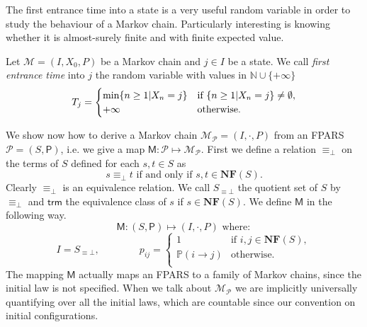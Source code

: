 \begin{LONG}
	The first entrance time into a state is a very useful random variable in order to study the behaviour of a Markov chain. Particularly interesting is knowing whether it is almost-surely finite and with finite expected value.
	\begin{definition}
		Let $\mathcal{M}=(I,X_0,P)$ be a Markov chain and $j\in I$ be a state. We call \emph{first entrance time} into $j$ the random variable with values in $\mathbb{N}\cup \{+\infty\}$
		$$
		T_j= \begin{cases}
		\min\{n\geq 1|X_n=j\} & \textnormal{if }\{n\geq 1|X_n=j\}\neq \emptyset,\\
		+\infty & \textnormal{otherwise}.
		\end{cases}
		$$
	\end{definition}
	We show now how to derive a Markov chain $\mathcal{M_P}=(I,\cdot,P)$ from an FPARS $\mathcal{P}=(S,\mathsf{P})$, i.e. we give a map $\mathsf{M}:\mathcal{P}\longmapsto\mathcal{M_P}$. First we define a relation $\equiv_\bot$ on the terms of $S$ defined for each $s,t\in S$ as
	$$
	s\equiv_\bot t\text{ if and only if }s,t\in\mathbf{NF}(S).
	$$
	Clearly $\equiv_\bot$ is an equivalence relation. We call $S_{\equiv\bot}$ the quotient set of $S$ by $\equiv_\bot$ and $\mathsf{trm}$ the equivalence class of $s$ if $s\in\mathbf{NF}(S)$. We define $\mathsf{M}$ in the following way.
	$$
	\mathsf{M}:(S,\mathsf{P})\longmapsto(I,\cdot,P) \text{ where}:
	$$
	$$
	I=S_{\equiv\bot},\qquad\qquad
	p_{ij}=\begin{cases}
	1 & \text{if } i,j\in\mathbf{NF}(S),\\
	\mathbb{P}(i\rightarrow j) & \text{otherwise}.\\	
	\end{cases}	
	$$
	The mapping $\mathsf{M}$ actually maps an FPARS to a family of Markov chains, since the initial law is not specified. When we talk about $\mathcal{M_P}$ we are implicitly universally quantifying over all the initial laws, which are countable since our convention on initial configurations.
	

\end{LONG}

